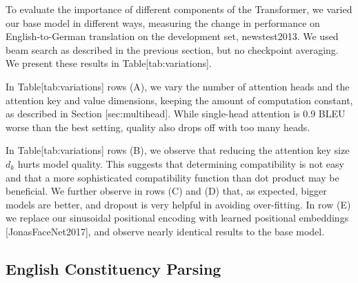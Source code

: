 \documentclass[11pt,a4paper]{article}
\begin{document}
To evaluate the importance of different components of the Transformer, we varied our base model in different ways, measuring the change in performance on English-to-German translation on the development set, newstest2013. We used beam search as described in the previous section, but no checkpoint averaging.  We present these results in Table[tab:variations].

In Table[tab:variations] rows (A), we vary the number of attention heads and the attention key and value dimensions, keeping the amount of computation constant, as described in Section [sec:multihead]. While single-head attention is 0.9 BLEU worse than the best setting, quality also drops off with too many heads.

In Table[tab:variations] rows (B), we observe that reducing the attention key size $d_k$ hurts model quality. This suggests that determining compatibility is not easy and that a more sophisticated compatibility function than dot product may be beneficial. We further observe in rows (C) and (D) that, as expected, bigger models are better, and dropout is very helpful in avoiding over-fitting.  In row (E) we replace our sinusoidal positional encoding with learned positional embeddings [JonasFaceNet2017], and observe nearly identical results to the base model.

\subsection{English Constituency Parsing}
\end{document}
